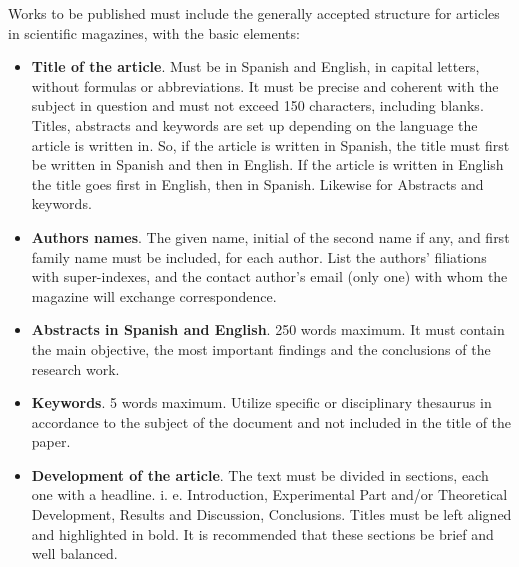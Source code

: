 \documentclass{momento}
\begin{document}
\begin{sloppypar}
Works to be published must include the generally accepted structure for articles in scientific magazines, with the basic elements:
\begin{itemize}
\item \textbf{Title of the article}. Must be in Spanish and English, in capital letters, without formulas or abbreviations. It must be precise and coherent with the subject in question and must not exceed 150 characters, including blanks. Titles, abstracts and keywords are set up depending on the language the article is written in. So, if the article is written in Spanish, the title must first be written in Spanish and then in English. If the article is written in English the title goes first in English, then in Spanish. Likewise for Abstracts and keywords.\vspace{-0.2cm}
\item \textbf{Authors names}. The given name, initial of the second name if any, and first family name must be included, for each author. List the authors’ filiations with super-indexes, and the contact author’s email (only one) with whom the magazine will exchange correspondence. \vspace{-0.2cm}
\item \textbf{Abstracts in Spanish and English}. 250 words maximum. It must contain the main objective, the most important findings and the conclusions of the research work. \vspace{-0.2cm}
\item \textbf{Keywords}. 5 words maximum. Utilize specific or disciplinary thesaurus in accordance to the subject of the document and not included in the title of the paper. \vspace{-0.2cm}
\item\textbf{Development of the article}. The text must be divided in sections, each one with a headline. i. e. Introduction, Experimental Part and/or Theoretical Development, Results and Discussion, Conclusions. Titles must be left aligned and highlighted in bold. It is recommended that these sections be brief and well balanced.
 \vspace{-0.2cm}

\end{itemize}
\end{sloppypar}
\end{document}
